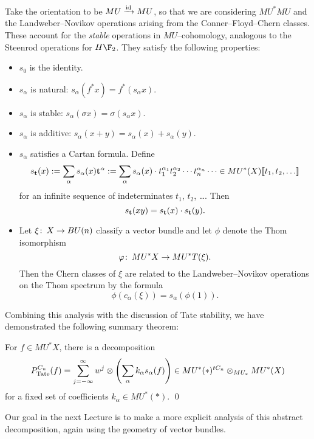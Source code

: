 \begin{definition}
Take the orientation to be $MU \xrightarrow{\mathrm{id}} MU$, so that we are considering $MU^* MU$ and the Landweber--Novikov operations arising from the Conner--Floyd--Chern classes.  These account for the \emph{stable} operations in $MU$--cohomology, analogous to the Steenrod operations for $H\F_2$.  They satisfy the following properties:
\begin{itemize}
\item $s_0$ is the identity.
\item $s_\alpha$ is natural: $s_\alpha(f^* x) = f^*(s_\alpha x)$.
\item $s_\alpha$ is stable: $s_\alpha(\sigma x) = \sigma(s_\alpha x)$.
\item $s_\alpha$ is additive: $s_\alpha(x + y) = s_\alpha(x) + s_\alpha(y)$.
\item $s_\alpha$ satisfies a Cartan formula.  Define \[s_{\mathbf t}(x) := \sum_{\alpha} s_\alpha(x) \mathbf t^\alpha := \sum_\alpha s_\alpha(x) \cdot t_1^{\alpha_1} t_2^{\alpha_2} \cdots t_n^{\alpha_n} \cdots \in MU^*(X)\llbracket{t_1, t_2, \ldots}\rrbracket\] for an infinite sequence of indeterminates $t_1$, $t_2$, \ldots.  Then \[s_{\mathbf t}(x y) = s_{\mathbf t}(x) \cdot s_{\mathbf t}(y).\]
\item Let $\xi\colon\thinspace X \to BU(n)$ classify a vector bundle and let $\phi$ denote the Thom isomorphism \[\varphi\colon\thinspace MU^* X \to MU^* T(\xi).\]  Then the Chern classes of $\xi$ are related to the Landweber--Novikov operations on the Thom spectrum by the formula \[\phi(c_\alpha(\xi)) = s_\alpha(\phi(1)).\]
\end{itemize}
\end{definition}

Combining this analysis with the discussion of Tate stability, we have demonstrated the following summary theorem:

\begin{corollary}
For $f \in MU^* X$, there is a decomposition \[P^{C_n}_{\mathrm{Tate}}(f) = \sum_{j = -\infty}^\infty w^j \otimes \left( \sum_\alpha k_\alpha s_\alpha(f) \right) \in MU^* (*)^{tC_n} \otimes_{MU_*} MU^*(X)\] for a fixed set of coefficients $k_\alpha \in MU^*(*)$. \qed
\end{corollary}

\noindent Our goal in the next Lecture is to make a more explicit analysis of this abstract decomposition, again using the geometry of vector bundles.













